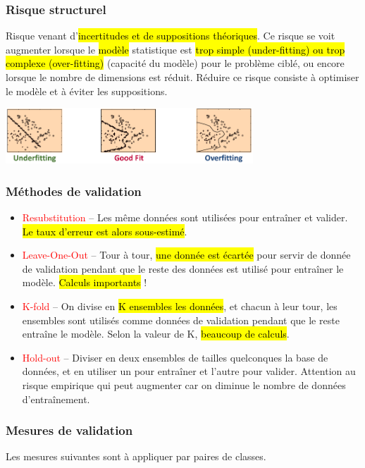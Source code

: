 \documentclass[letterpaper, 12pt]{article}
\newcommand{\alinea}{
\hspace*{0.5cm}}
\newcommand{\red}[1]{
	\textcolor{red}{#1}}
\begin{document}
			\subsubsection{Risque structurel}
				\alinea Risque venant d'\hl{incertitudes et de suppositions théoriques}. Ce risque se voit augmenter lorsque 
					le \hl{modèle} statistique est \hl{trop simple (under-fitting) ou trop complexe (over-fitting)} 
					(capacité du modèle) pour le problème ciblé, ou encore lorsque le nombre de dimensions est réduit. Réduire 
					ce risque consiste à optimiser le modèle et à éviter les suppositions.
				\begin{center}
					\includegraphics[width=3.66in]{Images/structural} 
				\end{center}
			\subsubsection{Méthodes de validation}
				\begin{itemize}
					\setlength\itemsep{0cm}
					\item \red{Resubstitution} -- Les même données sont utilisées pour entraîner et valider. \hl{Le taux d'erreur est
						alors sous-estimé}.
					\item \red{Leave-One-Out} -- Tour à tour, \hl{une donnée est écartée} pour servir de donnée de validation pendant
						que le reste des données est utilisé pour entraîner le modèle. \hl{Calculs importants} !
					\item \red{K-fold} -- On divise en \hl{K ensembles les données}, et chacun à leur tour, les ensembles sont utilisés
						comme données de validation pendant que le reste entraîne le modèle. Selon la valeur de K, \hl{beaucoup de calculs}.
					\item \red{Hold-out} -- Diviser en deux ensembles de tailles quelconques la base de données, et en utiliser un pour
						entraîner et l'autre pour valider. Attention au risque empirique qui peut augmenter car on diminue le nombre 
						de données d'entraînement.
				\end{itemize}
			\subsubsection{Mesures de validation}
				\alinea Les mesures suivantes sont à appliquer par paires de classes.
\end{document}
